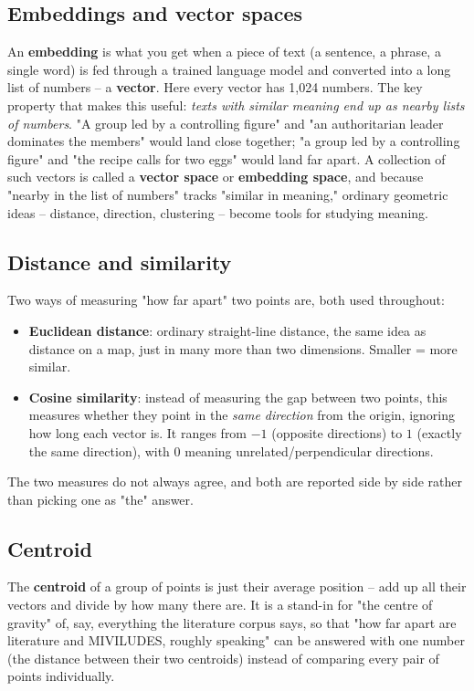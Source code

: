 \documentclass[11pt,a4paper]{article}
\newcommand{\jargon}[1]{\textbf{#1}}
\begin{document}
\subsection{Embeddings and vector spaces}
An \jargon{embedding} is what you get when a piece of text (a sentence,
a phrase, a single word) is fed through a trained language model and
converted into a long list of numbers -- a \jargon{vector}. Here every
vector has 1,024 numbers. The key property that makes this useful:
\emph{texts with similar meaning end up as nearby lists of numbers}.
"A group led by a controlling figure" and "an authoritarian leader
dominates the members" would land close together; "a group led by a
controlling figure" and "the recipe calls for two eggs" would land far
apart. A collection of such vectors is called a \jargon{vector space} or
\jargon{embedding space}, and because "nearby in the list of numbers"
tracks "similar in meaning," ordinary geometric ideas -- distance,
direction, clustering -- become tools for studying meaning.

\subsection{Distance and similarity}
Two ways of measuring "how far apart" two points are, both used
throughout:
\begin{itemize}[leftmargin=1.4em]
  \item \jargon{Euclidean distance}: ordinary straight-line distance,
  the same idea as distance on a map, just in many more than two
  dimensions. Smaller = more similar.
  \item \jargon{Cosine similarity}: instead of measuring the gap
  between two points, this measures whether they point in the
  \emph{same direction} from the origin, ignoring how long each vector
  is. It ranges from $-1$ (opposite directions) to $1$ (exactly the
  same direction), with $0$ meaning unrelated/perpendicular directions.
\end{itemize}
The two measures do not always agree, and both are reported side by
side rather than picking one as "the" answer.

\subsection{Centroid}
The \jargon{centroid} of a group of points is just their average
position -- add up all their vectors and divide by how many there are.
It is a stand-in for "the centre of gravity" of, say, everything the
literature corpus says, so that "how far apart are literature and
MIVILUDES, roughly speaking" can be answered with one number (the
distance between their two centroids) instead of comparing every pair
of points individually.
\end{document}
